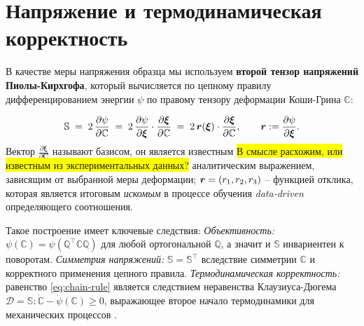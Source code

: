 \section{Напряжение и термодинамическая корректность}

В качестве меры напряжения образца мы используем \textbf{второй тензор напряжений Пиолы-Кирхгофа}, который вычисляется по цепному правилу дифференцированием энергии \(\psi\) 
по правому тензору деформации Коши-Грина \(\mathbb C\):

\begin{equation}
  \mathbb{S} \;=\; 2\,\frac{\partial \psi}{\partial \mathbb{C}}
  \;=\; 2\,\frac{\partial \psi}{\partial \boldsymbol{\xi}} \cdot \frac{\partial \boldsymbol{\xi}}{\partial \mathbb{C}}
  \;=\; 2\,\boldsymbol{r}(\boldsymbol{\xi})\cdot\frac{\partial \boldsymbol{\xi}}{\partial \mathbb{C}},
  \qquad \boldsymbol{r}:=\frac{\partial \psi}{\partial \boldsymbol{\xi}}.
  \label{eq:chain-rule}
\end{equation}
Вектор $\frac{\partial \boldsymbol\xi}{\partial \mathbf{C}}$ называют базисом, он является известным \colorbox{yellow}{В смысле расхожим, или известным из экспериментальных данных?} аналитическим выражением, зависящим от выбранной меры деформации; $\boldsymbol{r} = (r_1, r_2, r_3)$ -- функцией отклика, которая является итоговым \textit{искомым} в процессе обучения \textit{data-driven} определяющего соотношения.   

Такое построение имеет ключевые следствия:
\newline
\textit{Объективность:} $\psi(\mathbb{C})=\psi(\mathbb{Q}^\top\mathbb{C}\mathbb{Q})$ для любой ортогональной $\mathbb{Q}$, а значит и $\mathbb{S}$ инвариентен к поворотам.
\newline
\textit{Симметрия напряжений:} $\mathbb{S}=\mathbb{S}^\top$ вследствие симметрии $\mathbb{C}$ и корректного применения цепного правила.
\newline
\textit{Термодинамическая корректность:} равенство \eqref{eq:chain-rule} является следствием неравенства Клаузиуса-Дюгема 
$\mathcal{D} = \mathbb{S} : \dot{\mathbb{C}} - \dot{\psi}(\mathbb{C}) \geq 0$, 
выражающее второе начало термодинамики для механических процессов \cite{truesdell1984historical,truesdell2004nonlinear}.

